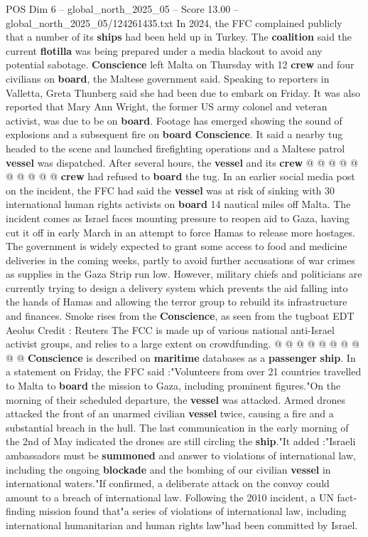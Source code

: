 \begin{textsample}{POS Dim 6 – global\_north\_2025\_05 – Score 13.00 – global\_north\_2025\_05/124261435.txt}
In 2024, the FFC complained publicly that a number of its \textbf{ships} had been held up in Turkey.
The \textbf{coalition} said the current \textbf{flotilla} was being prepared under a media blackout to avoid any potential sabotage. \textbf{Conscience} left Malta on Thursday with 12 \textbf{crew} and four civilians on \textbf{board}, the Maltese government said.
Speaking to reporters in Valletta, Greta Thunberg said she had been due to embark on Friday.
It was also reported that Mary Ann Wright, the former US army colonel and veteran activist, was due to be on \textbf{board}.
Footage has emerged showing the sound of explosions and a subsequent fire on \textbf{board} \textbf{Conscience}.
It said a nearby tug headed to the scene and launched firefighting operations and a Maltese patrol \textbf{vessel} was dispatched.
After several hours, the \textbf{vessel} and its \textbf{crew} @ @ @ @ @ @ @ @ @ @ \textbf{crew} had refused to \textbf{board} the tug.
In an earlier social media post on the incident, the FFC had said the \textbf{vessel} was at risk of sinking with 30 international human rights activists on \textbf{board} 14 nautical miles off Malta.
The incident comes as Israel faces mounting pressure to reopen aid to Gaza, having cut it off in early March in an attempt to force Hamas to release more hostages.
The government is widely expected to grant some access to food and medicine deliveries in the coming weeks, partly to avoid further accusations of war crimes as supplies in the Gaza Strip run low.
However, military chiefs and politicians are currently trying to design a delivery system which prevents the aid falling into the hands of Hamas and allowing the terror group to rebuild its infrastructure and finances.
Smoke rises from the \textbf{Conscience}, as seen from the tugboat EDT Aeolus Credit : Reuters The FCC is made up of various national anti-Israel activist groups, and relies to a large extent on crowdfunding. @ @ @ @ @ @ @ @ @ @ \textbf{Conscience} is described on \textbf{maritime} databases as a \textbf{passenger} \textbf{ship}.
In a statement on Friday, the FFC said :"Volunteers from over 21 countries travelled to Malta to \textbf{board} the mission to Gaza, including prominent figures."On the morning of their scheduled departure, the \textbf{vessel} was attacked.
Armed drones attacked the front of an unarmed civilian \textbf{vessel} twice, causing a fire and a substantial breach in the hull.
The last communication in the early morning of the 2nd of May indicated the drones are still circling the \textbf{ship}."It added :"Israeli ambassadors must be \textbf{summoned} and answer to violations of international law, including the ongoing \textbf{blockade} and the bombing of our civilian \textbf{vessel} in international waters."If confirmed, a deliberate attack on the convoy could amount to a breach of international law.
Following the 2010 incident, a UN fact-finding mission found that"a series of violations of international law, including international humanitarian and human rights law"had been committed by Israel.

\end{textsample}
